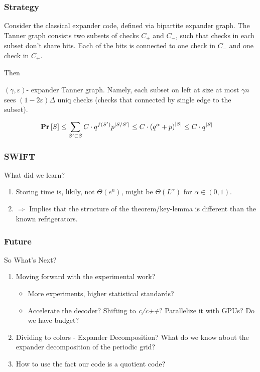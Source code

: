 \documentclass{beamer}
\begin{document}
\begin{frame}
  \frametitle{Strategy}
  Consider the classical expander code, defined via bipartite expander graph. The Tanner graph consists two subsets of checks $C_{+}$ and $C_{-}$, such that checks in each subset don't share bits. Each of the bits is connected to one check in $C_{-}$ and one check in $C_{+}$.


  Then 

    $(\gamma,\varepsilon)$- expander Tanner graph. Namely, each subset on left at size at most $\gamma n$ sees $(1-2\varepsilon)\Delta$ uniq checks (checks that connected by single edge to the subset).

  \begin{align*}
    \mathbf{Pr} \left[ S \right] &  \le \sum_{S^{\prime} \subset S }{C\cdot q^{f(S^{\prime}) }p^{|S /S^{\prime}|}  } \le C \cdot \left( q^{\alpha} + p \right)^{|S|} \le C \cdot q^{|S|}
  \end{align*}
\end{frame}
\begin{frame}
  \frametitle{SWIFT}

  \begin{block}{What did we learn?}
\begin{enumerate}
  \item Storing time is, likily, not $\Theta(e^{n})$, might be $\Theta(L^{\alpha})$ for $\alpha \in (0,1)$.   
  \item $ \Rightarrow $  Implies that the structure of the theorem/key-lemma is different than the known refrigerators.  
\end{enumerate}
  \end{block}
\end{frame}

\begin{frame}
  \frametitle{Future}
 \begin{block}{So What's Next?}
   \begin{enumerate}
     \item<+-> Moving forward with the experimental work? 
       \begin{itemize}
         \item More experiments, higher statistical standards?
         \item Accelerate the decoder? Shifting to \textit{c/c++}? Parallelize it with GPUs? Do we have budget? 
       \end{itemize}
     \item<+-> Dividing to colors - Expander Decomposition? What do we know about the expander decomposition of the periodic grid? 
     \item<+-> How to use the fact our code is a quotient code? 
   \end{enumerate}
 \end{block}
\end{frame}
\end{document}

